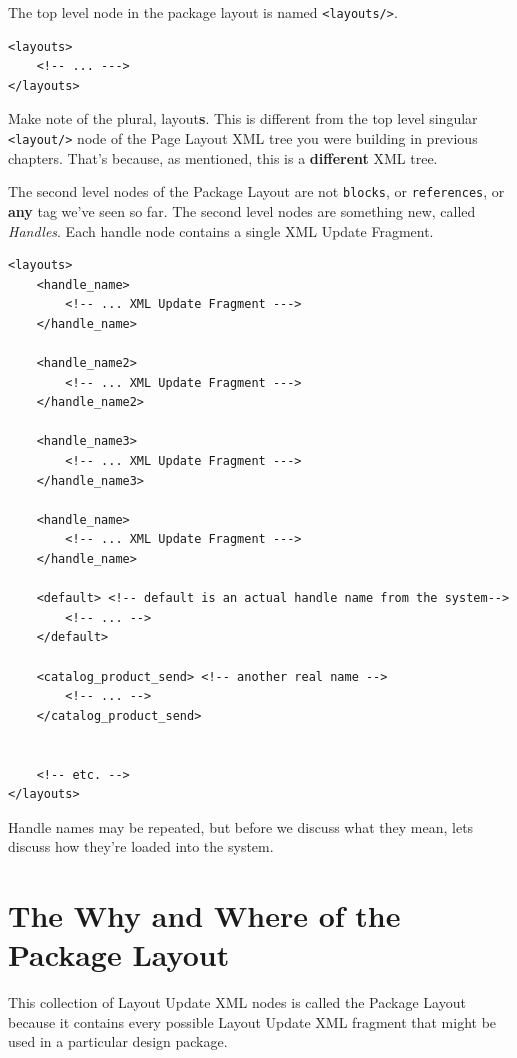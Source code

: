 \documentclass[oneside]{book}
\begin{document}
The top level node in the package layout is named \footnotesize\texttt{\textless layouts/\textgreater }\normalsize.

\begin{lstlisting}
<layouts>
    <!-- ... --->
</layouts>

\end{lstlisting}


Make note of the plural, layout\textbf{s}.  This is different from the top level singular  \footnotesize\texttt{\textless layout/\textgreater } \normalsize  node of the Page Layout XML tree you were building in previous chapters.  That's because, as mentioned, this is a \textbf{different} XML tree.

The second level nodes of the Package Layout are not \footnotesize\texttt{blocks}\normalsize, or \footnotesize\texttt{references}\normalsize, or \textbf{any} tag we've seen so far.  The second level nodes are something new, called \emph{Handles}.  Each handle node contains a single XML Update Fragment.

\begin{lstlisting}
<layouts>
    <handle_name>
        <!-- ... XML Update Fragment --->
    </handle_name>

    <handle_name2>
        <!-- ... XML Update Fragment --->
    </handle_name2>

    <handle_name3>
        <!-- ... XML Update Fragment --->
    </handle_name3>

    <handle_name>
        <!-- ... XML Update Fragment --->
    </handle_name>

    <default> <!-- default is an actual handle name from the system-->
        <!-- ... -->
    </default>

    <catalog_product_send> <!-- another real name -->
        <!-- ... -->
    </catalog_product_send>


    <!-- etc. -->
</layouts>

\end{lstlisting}


Handle names may be repeated, but before we discuss what they mean, lets discuss how they're loaded into the system.

\section{The Why and Where of the Package Layout}

This collection of Layout Update XML nodes is called the Package Layout because it contains every possible Layout Update XML fragment that might be used in a particular design package.
\end{document}
